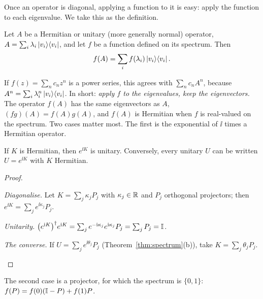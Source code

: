 Once an operator is diagonal, applying a function to it is easy: apply the function to each eigenvalue. We take this as the definition.

\begin{definition}\label{def:functional}
  Let $A$ be a Hermitian or unitary (more generally normal) operator, $A=\sum_i\lambda_i\left|v_i\right\rangle\!\left\langle v_i\right|$, and let $f$ be a function defined on its spectrum. Then
  \[
    f(A)=\sum_if(\lambda_i)\left|v_i\right\rangle\!\left\langle v_i\right|.
  \]
\end{definition}

If $f(z)=\sum_nc_nz^n$ is a power series, this agrees with $\sum_nc_nA^n$, because $A^n=\sum_i\lambda_i^n\left|v_i\right\rangle\!\left\langle v_i\right|$. In short: \emph{apply $f$ to the eigenvalues, keep the eigenvectors.} The operator $f(A)$ has the same eigenvectors as $A$, $(fg)(A)=f(A)g(A)$, and $f(A)$ is Hermitian when $f$ is real-valued on the spectrum. Two cases matter most. The first is the exponential of $\ii$ times a Hermitian operator.

\begin{proposition}\label{prop:expunitary}
  If $K$ is Hermitian, then $e^{\ii K}$ is unitary. Conversely, every unitary $U$ can be written $U=e^{\ii K}$ with $K$ Hermitian.
\end{proposition}
\begin{proof}
  \begin{steps}
    \item \emph{Diagonalise.} Let $K=\sum_j\kappa_jP_j$ with $\kappa_j\in\mathbb{R}$ and $P_j$ orthogonal projectors; then $e^{\ii K}=\sum_je^{\ii\kappa_j}P_j$.
    \item \emph{Unitarity.} $\bigl(e^{\mathrm{i} K}\bigr)^\dagger e^{\mathrm{i} K}=\sum_je^{-\mathrm{i}\kappa_j}e^{\mathrm{i}\kappa_j}P_j=\sum_jP_j=\mathbb{I}$.
    \item \emph{The converse.} If $U=\sum_je^{\ii\theta_j}P_j$ (Theorem~\ref{thm:spectrum}(b)), take $K=\sum_j\theta_jP_j$. \qedhere
  \end{steps}
\end{proof}

The second case is a projector, for which the spectrum is $\{0,1\}$: $f(P)=f(0)(\mathbb{I}-P)+f(1)P$.

